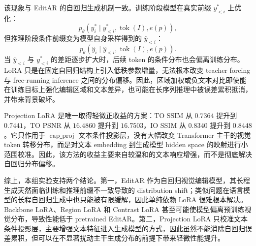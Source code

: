 该现象与 EditAR 的自回归生成机制一致。训练阶段模型在真实前缀 \(y_{<i}^{\ast}\) 上优化：
\[
p_{\theta}(y_i^\ast\mid y_{<i}^{\ast},\operatorname{tok}(I),e(p)),
\]
但推理阶段条件前缀变为模型自身采样得到的 \(\hat{y}_{<i}\)：
\[
p_{\theta}(\hat{y}_i\mid \hat{y}_{<i},\operatorname{tok}(I),e(p)).
\]
当 \(\hat{y}_{<i}\) 与 \(y_{<i}^{\ast}\) 的差距逐步扩大时，后续 token 的条件分布也会偏离训练分布。LoRA 只是在固定自回归结构上引入低秩参数增量，无法根本改变 teacher forcing 与 free-running inference 之间的分布偏移。因此，区域加权或负文本对比即使能在训练目标上强化编辑区域和文本差异，也可能在长序列推理中被误差累积抵消，并带来背景破坏。

Projection LoRA 是唯一取得轻微正收益的方案：TO SSIM 从 \(0.7364\) 提升到 \(0.7441\)，TO PSNR 从 \(16.4860\) 提升到 \(16.7503\)，IO SSIM 从 \(0.8340\) 提升到 \(0.8448\)。它只作用于 \(\operatorname{cap\_proj}\) 文本条件投影层，没有大幅改变 Transformer 主干的视觉 token 转移分布，而是对文本 embedding 到生成模型 hidden space 的映射进行小范围校准。因此，该方法的收益主要来自较温和的文本响应增强，而不是彻底解决自回归分布偏移。

综上，本组实验支持两个结论。第一，EditAR 作为自回归视觉编辑模型，其长程生成天然面临训练和推理前缀不一致导致的 distribution shift；类似问题在语言模型的长程自回归生成中也只能被有限缓解，因此单纯依赖 LoRA 很难根本解决。Backbone LoRA、Region LoRA 和 Contrast LoRA 甚至可能使模型偏离预训练视觉分布，导致性能低于 pretrained EditAR。第二，Projection LoRA 只校准文本条件投影层，主要增强文本特征进入生成模型的方式，因此虽然不能消除自回归误差累积，但可以在不显著扰动主干生成分布的前提下带来轻微性能提升。
